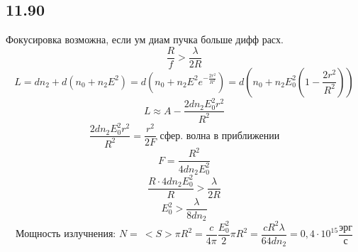 \subsection*{11.90}
Фокусировка возможна, если ум диам пучка больше дифф расх.
$$\frac{R}{f} > \frac{\lambda}{2R} $$
$$L = d n_2 + d(n_0 + n_2 E^2) = d (n_0 + n_2 E^2 e^{-\frac{2r^2}{R^2}}) = d(n_0 + n_2 E^2_0 (1 - \frac{2r^2}{R^2}) )$$
$$L \approx A - \frac{2dn_2E_0^2r^2}{R^2}$$
$$\frac{2dn_2E^2_0 r^2}{R^2} = \frac{r^2}{2F} \text{ сфер. волна в приближении}$$
$$F = \frac{R^2}{4dn_2E^2_0}$$
$$\frac{R \cdot 4 d n_2 E^2_0}{R} > \frac{\lambda}{2R}$$
$$E_0^2 > \frac{\lambda}{8dn_2}$$
$$\text{Мощность излучнения: } N = \  <S>\pi R^2 = \frac{c}{4\pi}\frac{E_0^2}{2}\pi R^2 = \frac{cR^2\lambda}{64dn_2} = 0,4 \cdot 10^{15} \frac{эрг}{с}$$